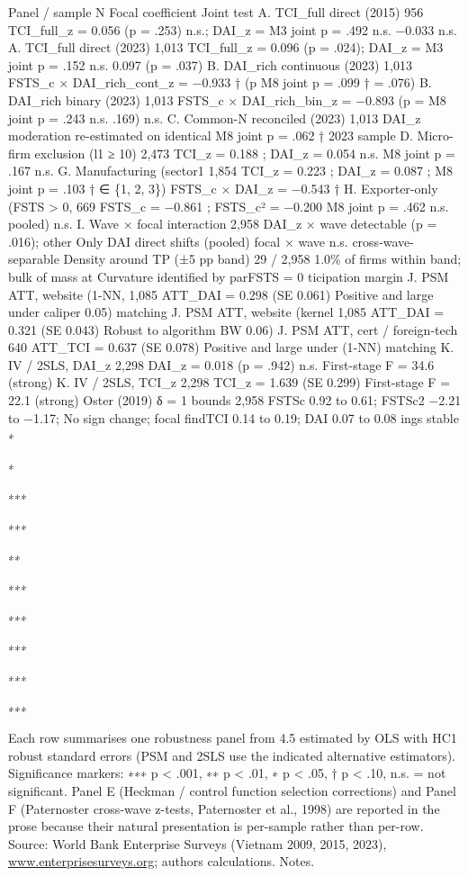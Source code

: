 \documentclass[12pt,a4paper]{article}
\begin{document}
Panel / sample N Focal coefficient Joint test A. TCI\_full direct (2015)
956 TCI\_full\_z = 0.056 (p = .253) n.s.; DAI\_z = M3 joint p = .492
n.s. −0.033 n.s. A. TCI\_full direct (2023) 1,013 TCI\_full\_z = 0.096
(p = .024); DAI\_z = M3 joint p = .152 n.s. 0.097 (p = .037) B.
DAI\_rich continuous (2023) 1,013 FSTS\_c × DAI\_rich\_cont\_z = −0.933
† (p M8 joint p = .099 † = .076) B. DAI\_rich binary (2023) 1,013
FSTS\_c × DAI\_rich\_bin\_z = −0.893 (p = M8 joint p = .243 n.s. .169)
n.s. C. Common-N reconciled (2023) 1,013 DAI\_z moderation re-estimated
on identical M8 joint p = .062 † 2023 sample D. Micro-firm exclusion (l1
≥ 10) 2,473 TCI\_z = 0.188 ; DAI\_z = 0.054 n.s. M8 joint p = .167 n.s.
G. Manufacturing (sector1 1,854 TCI\_z = 0.223 ; DAI\_z = 0.087 ; M8
joint p = .103 † ∈ \{1, 2, 3\}) FSTS\_c × DAI\_z = −0.543 † H.
Exporter-only (FSTS \textgreater{} 0, 669 FSTS\_c = −0.861 ; FSTS\_c² =
−0.200 M8 joint p = .462 n.s. pooled) n.s. I. Wave × focal interaction
2,958 DAI\_z × wave detectable (p = .016); other Only DAI direct shifts
(pooled) focal × wave n.s. cross-wave-separable Density around TP (±5 pp
band) 29 / 2,958 1.0\% of firms within band; bulk of mass at Curvature
identified by parFSTS = 0 ticipation margin J. PSM ATT, website (1-NN,
1,085 ATT\_DAI = 0.298 (SE 0.061) Positive and large under caliper 0.05)
matching J. PSM ATT, website (kernel 1,085 ATT\_DAI = 0.321 (SE 0.043)
Robust to algorithm BW 0.06) J. PSM ATT, cert / foreign-tech 640
ATT\_TCI = 0.637 (SE 0.078) Positive and large under (1-NN) matching K.
IV / 2SLS, DAI\_z 2,298 DAI\_z = 0.018 (p = .942) n.s. First-stage F =
34.6 (strong) K. IV / 2SLS, TCI\_z 2,298 TCI\_z = 1.639 (SE 0.299)
First-stage F = 22.1 (strong) Oster (2019) δ = 1 bounds 2,958 FSTSc 0.92
to 0.61; FSTSc2 −2.21 to −1.17; No sign change; focal findTCI 0.14 to
0.19; DAI 0.07 to 0.08 ings stable ∗

∗

∗∗∗

∗∗∗

∗∗

∗∗∗

∗∗∗

∗∗∗

∗∗∗

∗∗∗

Each row summarises one robustness panel from 4.5 estimated by OLS with
HC1 robust standard errors (PSM and 2SLS use the indicated alternative
estimators). Significance markers: ∗∗∗ p \textless{} .001, ∗∗ p
\textless{} .01, ∗ p \textless{} .05, † p \textless{} .10, n.s. = not
significant. Panel E (Heckman / control function selection corrections)
and Panel F (Paternoster cross-wave z-tests, Paternoster et al., 1998)
are reported in the prose because their natural presentation is
per-sample rather than per-row. Source: World Bank Enterprise Surveys
(Vietnam 2009, 2015, 2023),
\href{http://www.enterprisesurveys.org;}{www.enterprisesurveys.org;}
authors\textquotesingle{} calculations. Notes.
\end{document}
